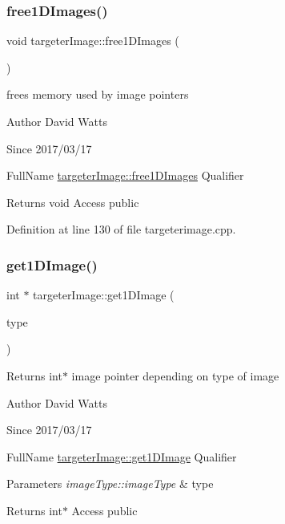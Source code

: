 \subsubsection{\texorpdfstring{free1\+D\+Images()}{free1DImages()}}
{\footnotesize\ttfamily void targeter\+Image\+::free1\+D\+Images (\begin{DoxyParamCaption}{ }\end{DoxyParamCaption})}

free\textquotesingle{}s memory used by image pointers

\begin{DoxyAuthor}{Author}
David Watts 
\end{DoxyAuthor}
\begin{DoxySince}{Since}
2017/03/17
\end{DoxySince}
Full\+Name \hyperlink{classtargeter_image_a45f6264d5e1ce760c376b1348137d970}{targeter\+Image\+::free1\+D\+Images} Qualifier \begin{DoxyReturn}{Returns}
void Access public 
\end{DoxyReturn}


Definition at line 130 of file targeterimage.\+cpp.

\mbox{\label{classtargeter_image_a7e046315df5fec0ac687a4a6beee1a63}} 
\subsubsection{\texorpdfstring{get1\+D\+Image()}{get1DImage()}}
{\footnotesize\ttfamily int $\ast$ targeter\+Image\+::get1\+D\+Image (\begin{DoxyParamCaption}\item[{image\+Type\+::image\+Type}]{type }\end{DoxyParamCaption})}

Returns int$\ast$ image pointer depending on type of image

\begin{DoxyAuthor}{Author}
David Watts 
\end{DoxyAuthor}
\begin{DoxySince}{Since}
2017/03/17
\end{DoxySince}
Full\+Name \hyperlink{classtargeter_image_a7e046315df5fec0ac687a4a6beee1a63}{targeter\+Image\+::get1\+D\+Image} Qualifier 
\begin{DoxyParams}{Parameters}
{\em image\+Type\+::image\+Type} & type \\
\hline
\end{DoxyParams}
\begin{DoxyReturn}{Returns}
int$\ast$ Access public 
\end{DoxyReturn}


